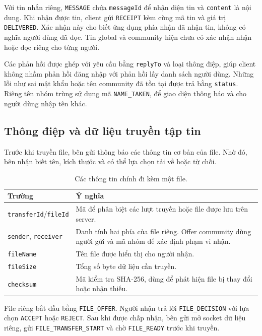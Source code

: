 Với tin nhắn riêng, \texttt{MESSAGE} chứa \texttt{messageId} để nhận diện tin và
\texttt{content} là nội dung. Khi nhận được tin, client gửi \texttt{RECEIPT}
kèm cùng mã tin và giá trị \texttt{DELIVERED}. Xác nhận này cho biết ứng dụng
phía nhận đã nhận tin, không có nghĩa người dùng đã đọc. Tin global và community
hiện chưa có xác nhận nhận hoặc đọc riêng cho từng người.

Các phản hồi được ghép với yêu cầu bằng \texttt{replyTo} và loại thông điệp,
giúp client không nhầm phản hồi đăng nhập với phản hồi lấy danh sách người dùng.
Những lỗi như sai mật khẩu hoặc tên community đã tồn tại được trả bằng
\texttt{status}. Riêng tên nhóm trùng sử dụng mã \texttt{NAME\_TAKEN}, để giao diện
thông báo và cho người dùng nhập tên khác.

\subsection{Thông điệp và dữ liệu truyền tập tin}

Trước khi truyền file, bên gửi thông báo các thông tin cơ bản của file.
Nhờ đó, bên nhận biết tên, kích thước và có thể lựa chọn tải về hoặc từ chối.

\begin{table}[H]
\centering\small
\begin{tabularx}{\linewidth}{p{3.8cm} >{\raggedright\arraybackslash}X}
\toprule
Trường & Ý nghĩa \\
\midrule
\texttt{transferId}/\texttt{fileId} & Mã để phân biệt các lượt truyền hoặc file được lưu trên server. \\
\texttt{sender}, \texttt{receiver} & Danh tính hai phía của file riêng. Offer community dùng người gửi và mã nhóm để xác định phạm vi nhận. \\
\texttt{fileName} & Tên file được hiển thị cho người nhận. \\
\texttt{fileSize} & Tổng số byte dữ liệu cần truyền. \\
\texttt{checksum} & Mã kiểm tra SHA-256, dùng để phát hiện file bị thay đổi hoặc nhận thiếu. \\
\bottomrule
\end{tabularx}
\caption{Các thông tin chính đi kèm một file.}
\end{table}

File riêng bắt đầu bằng \texttt{FILE\_OFFER}. Người nhận trả lời
\texttt{FILE\_DECISION} với lựa chọn \texttt{ACCEPT} hoặc \texttt{REJECT}.
Sau khi được chấp nhận, bên gửi mở socket dữ liệu riêng, gửi
\texttt{FILE\_TRANSFER\_START} và chờ \texttt{FILE\_READY} trước khi truyền.

